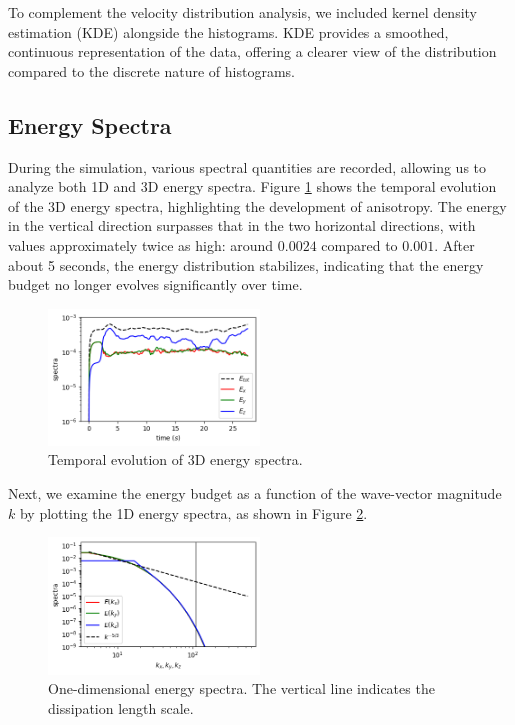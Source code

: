 \documentclass[final,5p,times,twocolumn,authoryear]{elsarticle}
\begin{document}
To complement the velocity distribution analysis, we included kernel density estimation (KDE) alongside the histograms. KDE provides a smoothed, continuous representation of the data, offering a clearer view of the distribution compared to the discrete nature of histograms.

\subsection{Energy Spectra}

During the simulation, various spectral quantities are recorded, allowing us to analyze both 1D and 3D energy spectra. Figure \ref{fig:3d spectra time} shows the temporal evolution of the 3D energy spectra, highlighting the development of anisotropy. The energy in the vertical direction surpasses that in the two horizontal directions, with values approximately twice as high: around $0.0024$ compared to $0.001$. After about 5 seconds, the energy distribution stabilizes, indicating that the energy budget no longer evolves significantly over time.

\begin{figure}[h]
\centering
\includegraphics[width=0.5\textwidth]{fig/3d_spectra_time.png}
\caption{Temporal evolution of 3D energy spectra.}
\label{fig:3d spectra time}
\end{figure}

Next, we examine the energy budget as a function of the wave-vector magnitude $k$ by plotting the 1D energy spectra, as shown in Figure \ref{fig:1d spectra}.

\begin{figure}[h]
\centering
\includegraphics[width=0.5\textwidth]{fig/1d_spectra.png}
\caption{One-dimensional energy spectra. The vertical line indicates the dissipation length scale.}
\label{fig:1d spectra}
\end{figure}
\end{document}
